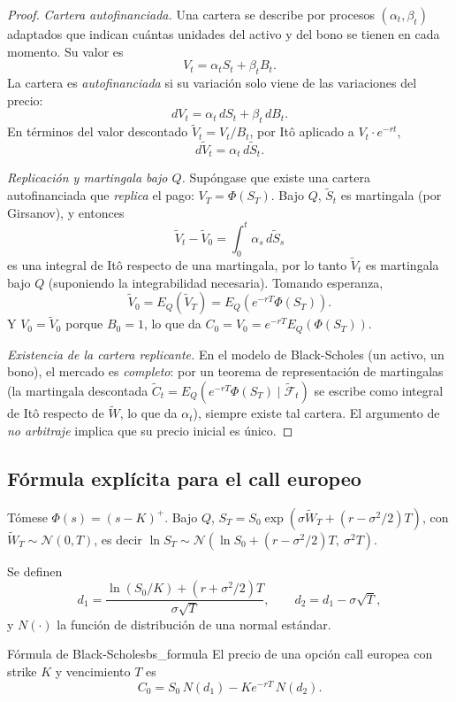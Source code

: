\documentclass[11pt, a4paper]{article}
\begin{document}
\begin{proof}
\textit{Cartera autofinanciada.} Una cartera se describe por procesos $(\alpha_t, \beta_t)$
adaptados que indican cuántas unidades del activo y del bono se tienen en cada momento. Su valor
es
$$ V_t = \alpha_t S_t + \beta_t B_t. $$
La cartera es \emph{autofinanciada} si su variación solo viene de las variaciones del precio:
$$ dV_t = \alpha_t \, dS_t + \beta_t \, dB_t. $$
En términos del valor descontado $\widetilde{V}_t = V_t / B_t$, por Itô aplicado a
$V_t \cdot e^{-rt}$,
$$ d\widetilde{V}_t = \alpha_t \, d\widetilde{S}_t. $$

\textit{Replicación y martingala bajo $Q$.} Supóngase que existe una cartera autofinanciada que
\emph{replica} el pago: $V_T = \Phi(S_T)$. Bajo $Q$, $\widetilde{S}_t$ es martingala (por
Girsanov), y entonces
$$ \widetilde{V}_t - \widetilde{V}_0 = \int_0^t \alpha_s \, d\widetilde{S}_s $$
es una integral de Itô respecto de una martingala, por lo tanto $\widetilde{V}_t$ es martingala
bajo $Q$ (suponiendo la integrabilidad necesaria). Tomando esperanza,
$$ \widetilde{V}_0 = E_Q(\widetilde{V}_T) = E_Q(e^{-rT} \Phi(S_T)). $$
Y $V_0 = \widetilde{V}_0$ porque $B_0 = 1$, lo que da $C_0 = V_0 = e^{-rT} E_Q(\Phi(S_T))$.

\textit{Existencia de la cartera replicante.} En el modelo de Black-Scholes (un activo, un bono),
el mercado es \emph{completo}: por un teorema de representación de martingalas (la martingala
descontada $\widetilde{C}_t = E_Q(e^{-rT} \Phi(S_T) \mid \widetilde{\mathcal{F}}_t)$ se escribe como
integral de Itô respecto de $\widetilde{W}$, lo que da $\alpha_t$), siempre existe tal cartera.
El argumento de \emph{no arbitraje} implica que su precio inicial es único.
\end{proof}

\subsection{Fórmula explícita para el call europeo}

Tómese $\Phi(s) = (s - K)^+$. Bajo $Q$, $S_T = S_0 \exp(\sigma \widetilde{W}_T + (r -
\sigma^2/2) T)$, con $\widetilde{W}_T \sim \mathcal{N}(0, T)$, es decir
$\ln S_T \sim \mathcal{N}(\ln S_0 + (r - \sigma^2/2) T, \ \sigma^2 T)$.

Se definen
$$ d_1 = \frac{\ln(S_0/K) + (r + \sigma^2/2) T}{\sigma \sqrt{T}}, \qquad
d_2 = d_1 - \sigma \sqrt{T}, $$
y $N(\cdot)$ la función de distribución de una normal estándar.

\begin{teorema}{Fórmula de Black-Scholes}{bs_formula}
El precio de una opción call europea con strike $K$ y vencimiento $T$ es
$$ C_0 = S_0 \, N(d_1) - K e^{-rT} \, N(d_2). $$
\end{teorema}
\end{document}
